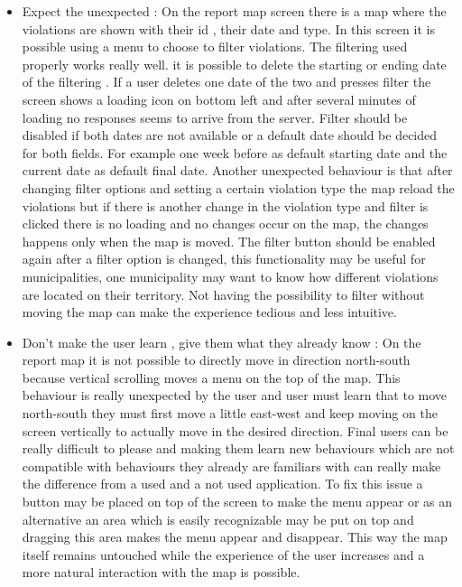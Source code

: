 \begin{itemize}
\item Expect the unexpected : On the report map screen there is a map where the violations are shown with their id , their date and type. In this screen it is possible using a menu to choose to filter violations. The filtering used properly works really well. it is possible to delete the starting or ending date of the filtering . If a user deletes one date of the two and presses filter the screen shows a loading icon on bottom left and after several minutes of loading no responses seems to arrive from the server. Filter should be disabled if both dates are not available or a default date should be decided for both fields. For example one week before as default starting date and the current date as default final date. Another unexpected behaviour is that after changing filter options and setting a certain violation type the map reload the violations but if there is another change in the violation type and filter is clicked there is no loading and no changes occur on the map, the changes happens only when the map is moved.
The filter button should be enabled again after a filter option is changed, this functionality may be useful for municipalities, one municipality may want  to know how different violations are located on their territory. Not having the possibility to filter without moving the map can make the experience tedious and less intuitive.
\item Don't make the user learn , give them what they already know : On the report map it is not possible to directly move in direction north-south because vertical scrolling moves a menu on the top of the map. This behaviour is really unexpected by the user and user must learn that to move north-south they must first move a little east-west and keep moving on the screen vertically to actually move in the desired direction. Final users can be really difficult to please and making them learn new behaviours which are not compatible with behaviours they already are familiars with can really make the difference from a used and a not used application. To fix this issue a button may be placed on top of the screen to make the menu appear or as an alternative an area which is easily recognizable may be put on top and dragging this area makes the menu appear and disappear. This way the map itself remains untouched while the experience of the user increases and a more natural interaction with the map is possible.
\end{itemize}
